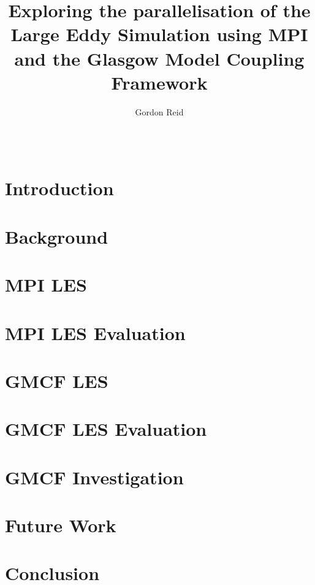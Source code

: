 \documentclass{acm_proc_article-sp}
\title{Exploring the parallelisation of the Large Eddy Simulation using MPI and
the Glasgow Model Coupling Framework}
\author{
    \alignauthor
    Gordon Reid\\
    \affaddr{School of Computing Science}\\
    \affaddr{University of Glasgow}\\
    \email{1002536r@student.gla.ac.uk}
}
\begin{document}
\maketitle

\begin{abstract}

\end{abstract}

\section{Introduction}


\section{Background}
\label{sec:Background}


\section{MPI LES}
\label{sec:MPILES}


\section{MPI LES Evaluation}
\label{sec:MPILESEval}


\section{GMCF LES}
\label{sec:GMCFLES}


\section{GMCF LES Evaluation}
\label{sec:GMCFLESEval}


\section{GMCF Investigation}
\label{sec:GMCFInvestigation}


\section{Future Work}
\label{sec:FutureWork}


\section{Conclusion}
\label{sec:Conclusion}




\end{document}

